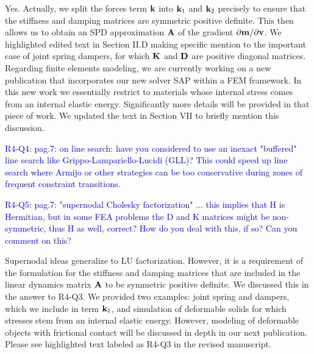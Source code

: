 Yes. Actually, we split the forces term ${\mathbf{k}}$ into ${\mathbf{k}}_1$ and ${\mathbf{k}}_2$
precisely to ensure that the stiffness and damping matrices are symmetric
positive definite. This then allows us to obtain an SPD approximation ${\mathbf{A}}$ of
the gradient $\partial {\mathbf{m}}/\partial {\mathbf{v}}$. We highlighted edited text in
Section II.D making specific mention to the important case of joint spring
dampers, for which ${\mathbf{K}}$ and ${\mathbf{D}}$ are positive diagonal matrices.
Regarding finite elements modeling, we are currently working on a new
publication that incorporates our new solver SAP within a FEM framework. In this
new work we essentially restrict to materials whose internal stress comes from
an internal elastic energy. Significantly more details will be provided in that
piece of work. We updated the text in Section VII to briefly mention this
discussion.

\vspace{5mm}

\textcolor{blue}{R4-Q4: pag.7: on line search: have you considered to use an
inexact "buffered" line search like Grippo-Lampariello-Lucidi (GLL)? This could
speed up line search where Armijo or other strategies can be too conservative
during zones of frequent constraint transitions.}


\vspace{5mm}

\textcolor{blue}{R4-Q5: pag.7: "supernodal Cholesky factorization" ... this
implies that H is Hermitian, but in some FEA problems the D and K matrices might
be non-symmetric, thus H as well, correct? How do you deal with this, if so? Can
you comment on this? }

Supernodal ideas generalize to LU factorization. However, it is a requirement of
the formulation for the stiffness and damping matrices that are included in the
linear dynamics matrix ${\mathbf{A}}$ to be symmetric positive definite. We discussed
this in the answer to R4-Q3. We provided two examples: joint spring and dampers,
which we include in term ${\mathbf{k}}_1$, and simulation of deformable solids for
which stresses stem from an internal elastic energy. However, modeling
of deformable objects with frictional contact will be discussed in depth in our
next publication. Please see highlighted text labeled as R4-Q3 in the revised
manuscript.

